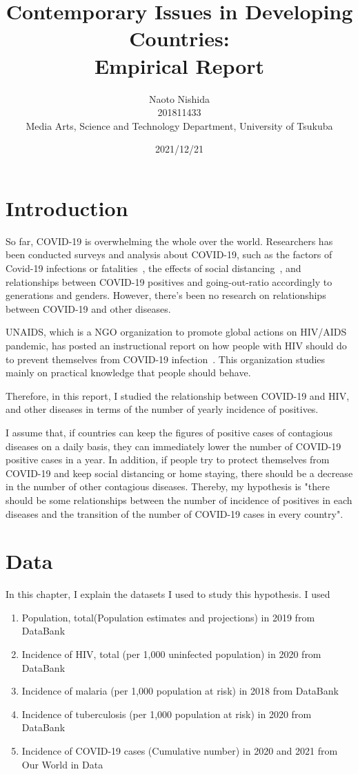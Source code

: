 \documentclass[12pt]{report}
\title{Contemporary Issues in Developing Countries: \\Empirical Report}
\author{Naoto Nishida\\201811433\\ Media Arts, Science and Technology Department, University of Tsukuba}
\date{2021/12/21}
\begin{document}
\maketitle
\tableofcontents

\chapter{Introduction}

So far, COVID-19 is overwhelming the whole over the world.
Researchers has been conducted surveys and analysis about COVID-19, such as the factors of Covid-19 infections or fatalities~\cite{toya2021cross,tsubasa2021modeling}, the effects of social distancing~\cite{CATO202051}, and relationships between COVID-19 positives and going-out-ratio accordingly to generations and genders.
However, there's been no research on relationships between COVID-19 and other diseases. 

UNAIDS, which is a NGO organization to promote global actions on HIV/AIDS pandemic, has posted an instructional report on how people with HIV should do to prevent themselves from COVID-19 infection~\cite{unaids, unaids_report}.
This organization studies mainly on practical knowledge that people should behave.

Therefore, in this report, I studied the relationship between COVID-19 and HIV, and other diseases in terms of the number of yearly incidence of positives. 


I assume that, if countries can keep the figures of positive cases of contagious diseases on a daily basis, they can immediately lower the number of COVID-19 positive cases in a year.
In addition, if people try to protect themselves from COVID-19 and keep social distancing or home staying, there should be a decrease in the number of other contagious diseases.
Thereby, my hypothesis is "there should be some relationships between the number of incidence of positives in each diseases and the transition of the number of COVID-19 cases in every country".

\chapter{Data}

In this chapter, I explain the datasets I used to study this hypothesis.
I used 
\begin{enumerate}
    \item Population, total(Population estimates and projections) in 2019 from DataBank~\cite{databank}
    \item Incidence of HIV, total (per 1,000 uninfected population) in 2020 from DataBank~\cite{databank}
    \item Incidence of malaria (per 1,000 population at risk) in 2018 from DataBank~\cite{databank}
    \item Incidence of tuberculosis (per 1,000 population at risk) in 2020 from DataBank~\cite{databank}
    \item Incidence of COVID-19 cases (Cumulative number) in 2020 and 2021 from Our World in Data~\cite{ourworldindata}
\end{enumerate}
\end{document}
